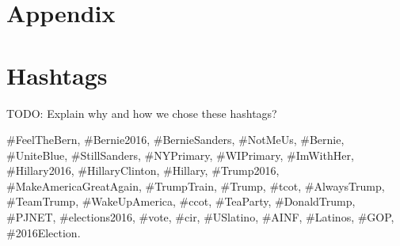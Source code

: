 \newpage
\section{Appendix}
\appendix
\section{Hashtags}
\label{appendix:hashtags}

TODO: Explain why and how we chose these hashtags?

\#FeelTheBern, \#Bernie2016, \#BernieSanders, \#NotMeUs, \#Bernie, \#UniteBlue,
\#StillSanders, \#NYPrimary, \#WIPrimary, \#ImWithHer, \#Hillary2016,
\#HillaryClinton, \#Hillary, \#Trump2016, \#MakeAmericaGreatAgain, \#TrumpTrain,
\#Trump, \#tcot, \#AlwaysTrump, \#TeamTrump, \#WakeUpAmerica, \#ccot,
\#TeaParty, \#DonaldTrump, \#PJNET, \#elections2016, \#vote, \#cir, \#USlatino,
\#AINF, \#Latinos, \#GOP, \#2016Election.
